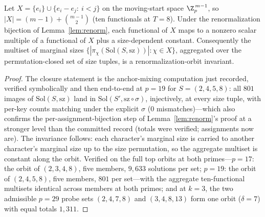 \begin{lemma}\label{lem:char10}
Let $X=\{e_i\}\cup\{e_i-e_j:\ i<j\}$ on the moving-start space
$\Z_p^{\,m-1}$, so $|X|=(m-1)+\binom{m-1}{2}$ (ten functionals at
$T=8$). Under the renormalization bijection of Lemma~\ref{lem:renorm},
each functional of $X$ maps to a nonzero scalar multiple of a
functional of $X$ plus a size-dependent constant. Consequently the
multiset of marginal sizes
$\{|\pi_\chi(\mathrm{Sol}(S,\mathrm{sz}))|:\chi\in X\}$, aggregated
over the permutation-closed set of size tuples, is a
renormalization-orbit invariant.
\end{lemma}

\begin{proof}
The closure statement is the anchor-mixing computation just recorded,
verified symbolically and then end-to-end at $p=19$ for
$S=(2,4,5,8)$: all $801$ images of $\mathrm{Sol}(S,\mathrm{sz})$ land
in $\mathrm{Sol}(S',\mathrm{sz}\circ\sigma)$, injectively, at every
size tuple, with per-key counts matching under the explicit $\sigma$
($0$ mismatches)---which also confirms the per-assignment-bijection
step of Lemma~\ref{lem:renorm}'s proof at a stronger level than the
committed record (totals were verified; assignments now are). The
invariance follows: each character's marginal size is carried to
another character's marginal size up to the size permutation, so the
aggregate multiset is constant along the orbit. Verified on the full
top orbits at both primes---$p=17$: the orbit of $(2,3,4,8)$, five
members, $9{,}633$ solutions per set; $p=19$: the orbit of
$(2,4,5,8)$, five members, $801$ per set---with the aggregate
ten-functional multisets identical across members at both primes; and
at $k=3$, the two admissible $p=29$ probe sets $(2,4,7,8)$ and
$(3,4,8,13)$ form one orbit ($\delta=7$) with equal totals $1{,}311$.
\end{proof}

